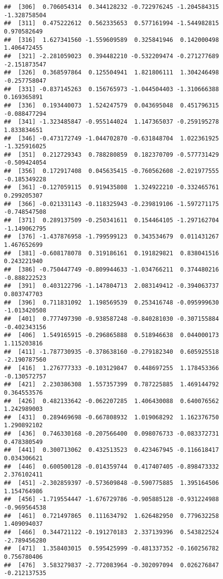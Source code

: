 \documentclass[
]{article}
\begin{document}
\begin{verbatim}
##  [306]  0.706054314  0.344128232 -0.722976245 -1.204584315 -1.328758504
##  [311]  0.475222612  0.562335653  0.577161994 -1.544982815  0.970582649
##  [316]  1.627341560 -1.559609589  0.325841946  0.142000498  1.406472455
##  [321] -2.281059023  0.394482210 -0.532209474 -0.271277689 -2.151873547
##  [326]  0.368597864  0.125504941  1.821806111  1.304246498 -0.257758047
##  [331] -0.837145263  0.156765973 -1.044504403 -1.310666388  0.169365891
##  [336]  0.193440073  1.524247579  0.043695048  0.451796315 -0.088477294
##  [341] -1.323485847 -0.955144024  1.147365037 -0.259195278  1.833834651
##  [346] -0.473172749 -1.044702870 -0.631848704  1.022361925 -1.325916025
##  [351]  0.212729343  0.788280859  0.182370709 -0.577731429 -0.509424054
##  [356]  0.172917408  0.045635415 -0.760562608 -2.021977555 -0.185349228
##  [361] -0.127059115  0.919435808  1.324922210 -0.332465761  0.299205307
##  [366] -0.021331143 -0.118325943 -0.239819106 -1.597271175 -0.748547508
##  [371]  0.289137509 -0.250341611  0.154464105 -1.297162704 -1.149062795
##  [376] -1.437876958 -1.799599123  0.343534679  0.011431267  1.467652699
##  [381] -0.608178078  0.319186161  0.191829821  0.838041516  0.243221940
##  [386] -0.750447749 -0.809944633 -1.034766211  0.374480216 -0.888222523
##  [391]  0.403122796 -1.147804713  2.083149412 -0.394063737  0.803747703
##  [396]  0.711831092  1.198569539  0.253416748 -0.095999630 -1.013420508
##  [401]  0.777497390 -0.938587248 -0.840281030 -0.307155884 -0.402343156
##  [406]  1.549165915 -0.296865888  0.518946638  0.044000173  1.115203816
##  [411] -1.787730935 -0.378638160 -0.279182340  0.605925518 -2.190787560
##  [416]  1.276777333 -0.103129847  0.448697255  1.178453366 -0.130572757
##  [421]  2.230386308  1.557357399  0.787225885  1.469144792  0.364553576
##  [426]  0.482133642 -0.062207285  1.406430088  0.640076562  1.242989003
##  [431]  0.289469698 -0.667808932  1.019068292  1.162376750  1.290892102
##  [436]  0.746330168 -0.207566400  0.098076733 -0.083372731  0.478380549
##  [441]  0.300713062  0.432513523  0.423467945 -0.116618417  0.034306621
##  [446]  0.600500128 -0.014359744  0.417407405 -0.898473332  2.376102411
##  [451] -2.302859397 -0.573609848 -0.590775885  1.395164506  1.154764986
##  [456] -1.719554447 -1.676729786 -0.905885128 -0.931224988 -0.969564538
##  [461]  0.721497865  0.111634792  1.626482950  0.779632258  1.409094037
##  [466]  0.344721122 -0.191270183  2.337139396  0.543822524 -2.789456280
##  [471]  1.358403015  0.595425999 -0.481337352 -0.160256782  0.756780406
##  [476]  3.583279837 -2.772083964 -0.302097094  0.026276847 -0.212137535

\end{verbatim}
\end{document}
